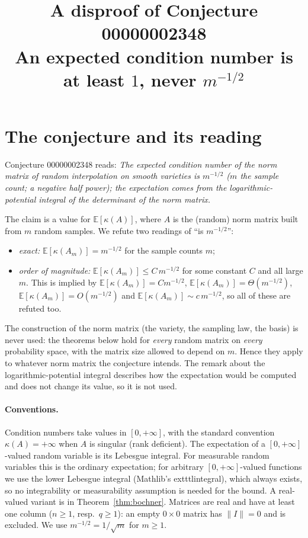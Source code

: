 \documentclass[11pt]{article}
\title{A disproof of Conjecture 00000002348\\[2pt]
\large An expected condition number is at least $1$, never $m^{-1/2}$}
\date{}
\renewcommand{\_}{\oldus\allowbreak}
\theoremstyle{definition}
\theoremstyle{remark}
\begin{document}
\sloppy
\maketitle

\section{The conjecture and its reading}

Conjecture 00000002348 reads: \emph{The expected condition number of the norm matrix of random
interpolation on smooth varieties is $m^{-1/2}$ ($m$ the sample count; a negative half power); the
expectation comes from the logarithmic-potential integral of the determinant of the norm matrix.}

The claim is a value for $\mathbb{E}[\kappa(A)]$, where $A$ is the (random) norm matrix built from
$m$ random samples. We refute two readings of ``is $m^{-1/2}$'':
\begin{itemize}
\item[(E)] \emph{exact:} $\mathbb{E}[\kappa(A_m)] = m^{-1/2}$ for the sample counts $m$;
\item[(O)] \emph{order of magnitude:} $\mathbb{E}[\kappa(A_m)] \le C\,m^{-1/2}$ for some constant $C$
and all large $m$. This is implied by $\mathbb{E}[\kappa(A_m)] = C m^{-1/2}$,
$\mathbb{E}[\kappa(A_m)] = \Theta(m^{-1/2})$, $\mathbb{E}[\kappa(A_m)] = O(m^{-1/2})$ and
$\mathbb{E}[\kappa(A_m)] \sim c\, m^{-1/2}$, so all of these are refuted too.
\end{itemize}
The construction of the norm matrix (the variety, the sampling law, the basis) is never used: the
theorems below hold for \emph{every} random matrix on \emph{every} probability space, with the matrix size
allowed to depend on $m$. Hence they apply to whatever norm matrix the conjecture intends. The remark
about the logarithmic-potential integral describes how the expectation would be computed and does
not change its value, so it is not used.

\paragraph{Conventions.}
Condition numbers take values in $[0,+\infty]$, with the standard convention $\kappa(A)=+\infty$ when
$A$ is singular (rank deficient). The expectation of a $[0,+\infty]$-valued random variable is its
Lebesgue integral. For measurable random variables this is the ordinary expectation; for arbitrary
$[0,+\infty]$-valued functions we use the lower Lebesgue integral (Mathlib's 	exttt{lintegral}), which
always exists, so no integrability or measurability assumption is needed for the bound. A
real-valued variant is in Theorem~\ref{thm:bochner}. Matrices are real and have at least one column
($n\ge1$, resp.\ $q\ge 1$): an empty $0\times 0$ matrix has $\|I\|=0$ and is excluded.
We use $m^{-1/2}=1/\sqrt m$ for $m\ge1$.
\end{document}
